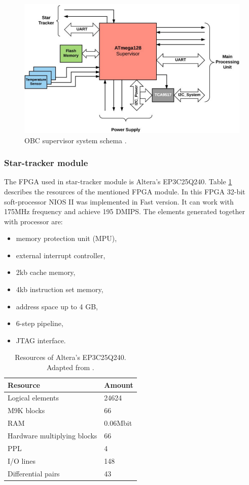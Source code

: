 \documentclass[12pt,a4paper,oneside]{article}
\begin{document}
\begin{figure}[!htbp]
\includegraphics[scale=0.48]{obc_supervisor.png}
\centering
\caption{OBC supervisor system schema \cite{gaska2016obc}.}
\label{fig:obc-supervisor}
\end{figure}

\subsubsection{Star-tracker module}

The FPGA used in star-tracker module is Altera's EP3C25Q240. Table \ref{tab:obc-fpga} describes the resources of the mentioned FPGA module. In this FPGA 32-bit soft-processor NIOS II was implemented in Fast version. It can work with 175MHz frequency and achieve 195 DMIPS. The elements generated together with processor are:
\begin{itemize}
\item memory protection unit (MPU),
\item external interrupt controller,
\item 2kb cache memory,
\item 4kb instruction set memory,
\item address space up to 4 GB,
\item 6-step pipeline,
\item JTAG interface.
\end{itemize}


\begin{table}[!htbp]
\centering
\begin{tabular}{|p{6cm}|p{3cm}|}
\hline 
\textbf{Resource} & \textbf{Amount} \\ 
\hline 
Logical elements & 24624 \\ 
\hline 
M9K blocks & 66 \\ 
\hline 
RAM & 0.06Mbit \\ 
\hline 
Hardware multiplying blocks & 66 \\ 
\hline 
PPL & 4 \\ 
\hline 
I/O lines & 148 \\ 
\hline 
Differential pairs & 43 \\ 
\hline 
\end{tabular} 
\caption{Resources of Altera's EP3C25Q240. Adapted from \citet{gaska2016obc}.}
\label{tab:obc-fpga}
\end{table}
\end{document}
